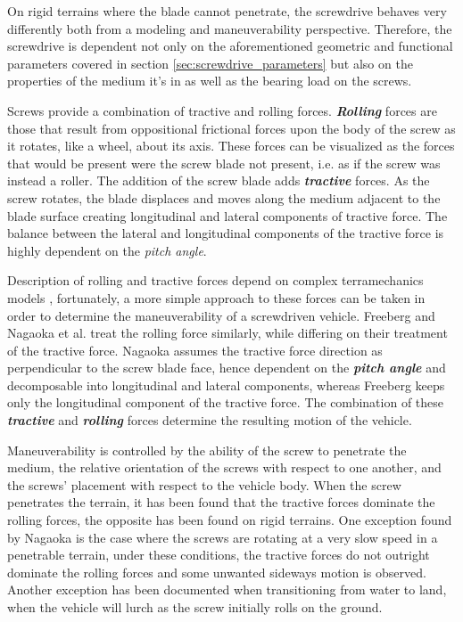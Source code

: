 On rigid terrains where the blade cannot penetrate, the screwdrive behaves very differently both from a modeling and maneuverability perspective. Therefore, the screwdrive is dependent not only on the aforementioned geometric and functional parameters covered in section \ref{sec:screwdrive_parameters} but also on the properties of the medium it's in as well as the bearing load on the screws. 

Screws provide a combination of tractive and rolling forces. \textbf{\emph{Rolling }} forces are those that result from oppositional frictional forces upon the body of the screw as it rotates, like a wheel, about its axis. These forces can be visualized as the forces that would be present were the screw blade not present, i.e. as if the screw was instead a roller. The addition of the screw blade adds \textbf{\emph{tractive}} forces. As the screw rotates, the blade displaces and moves along the medium adjacent to the blade surface creating longitudinal and lateral components of tractive force. The balance between the lateral and longitudinal components of the tractive force is highly dependent on the \emph{pitch angle}.

Description of rolling and tractive forces depend on complex terramechanics models \cite{Nagaoka2010a, Cole1961}, fortunately, a more simple approach to these forces can be taken in order to determine the maneuverability of a screwdriven vehicle. Freeberg \cite{Freeberg2010} and Nagaoka et al. \cite{Nagaoka2009b} treat the rolling force similarly, while differing on their treatment of the tractive force. Nagaoka assumes the tractive force direction as perpendicular to the screw blade face, hence dependent on the \textbf{\emph{pitch angle}} and decomposable into longitudinal and lateral components, whereas Freeberg keeps only the longitudinal component of the tractive force. The combination of these \textbf{\emph{tractive}} and \textbf{\emph{rolling}} forces determine the resulting motion of the vehicle. 

Maneuverability is controlled by the ability of the screw to penetrate the medium, the relative orientation of the screws with respect to one another, and the screws' placement with respect to the vehicle body. When the screw penetrates the terrain, it has been found that the tractive forces dominate the rolling forces, the opposite has been found on rigid terrains. One exception found by Nagaoka \cite{Nagaoka2009a} is the case where the screws are rotating at a very slow speed in a penetrable terrain, under these conditions, the tractive forces do not outright dominate the rolling forces and some unwanted sideways motion is observed. Another exception has been documented \cite{Cole1961} when transitioning from water to land, when the vehicle will lurch as the screw initially rolls on the ground. 

